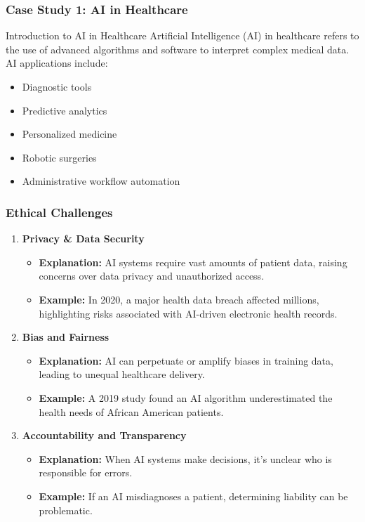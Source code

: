 \documentclass[aspectratio=169]{beamer}
\begin{document}
\begin{frame}[fragile]
    \frametitle{Case Study 1: AI in Healthcare}
    \begin{block}{Introduction to AI in Healthcare}
        Artificial Intelligence (AI) in healthcare refers to the use of advanced algorithms and software to interpret complex medical data. AI applications include:
        \begin{itemize}
            \item Diagnostic tools
            \item Predictive analytics
            \item Personalized medicine
            \item Robotic surgeries
            \item Administrative workflow automation
        \end{itemize}
    \end{block}
\end{frame}

\begin{frame}[fragile]
    \frametitle{Ethical Challenges}
    \begin{enumerate}
        \item \textbf{Privacy \& Data Security}
            \begin{itemize}
                \item \textbf{Explanation:} AI systems require vast amounts of patient data, raising concerns over data privacy and unauthorized access.
                \item \textbf{Example:} In 2020, a major health data breach affected millions, highlighting risks associated with AI-driven electronic health records.
            \end{itemize}

        \item \textbf{Bias and Fairness}
            \begin{itemize}
                \item \textbf{Explanation:} AI can perpetuate or amplify biases in training data, leading to unequal healthcare delivery.
                \item \textbf{Example:} A 2019 study found an AI algorithm underestimated the health needs of African American patients.
            \end{itemize}
        
        \item \textbf{Accountability and Transparency}
            \begin{itemize}
                \item \textbf{Explanation:} When AI systems make decisions, it's unclear who is responsible for errors.
                \item \textbf{Example:} If an AI misdiagnoses a patient, determining liability can be problematic.
            \end{itemize}
    \end{enumerate}
\end{frame}
\end{document}
